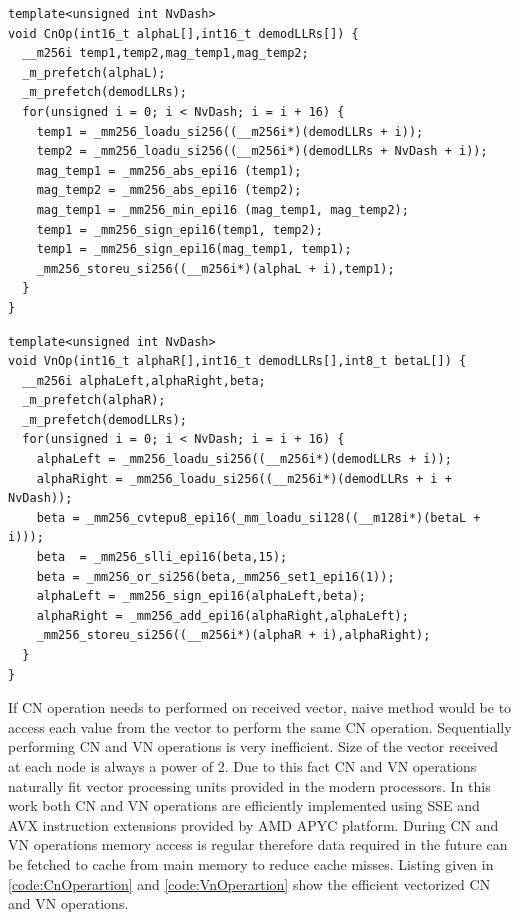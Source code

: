 \begin{code}
\label{code:CnOperartion}
\begin{verbatim}
template<unsigned int NvDash>
void CnOp(int16_t alphaL[],int16_t demodLLRs[]) {
  __m256i temp1,temp2,mag_temp1,mag_temp2;
  _m_prefetch(alphaL);
  _m_prefetch(demodLLRs);
  for(unsigned i = 0; i < NvDash; i = i + 16) {
	temp1 = _mm256_loadu_si256((__m256i*)(demodLLRs + i));
	temp2 = _mm256_loadu_si256((__m256i*)(demodLLRs + NvDash + i));
	mag_temp1 = _mm256_abs_epi16 (temp1);
	mag_temp2 = _mm256_abs_epi16 (temp2);
	mag_temp1 = _mm256_min_epi16 (mag_temp1, mag_temp2);
	temp1 = _mm256_sign_epi16(temp1, temp2);
	temp1 = _mm256_sign_epi16(mag_temp1, temp1);
	_mm256_storeu_si256((__m256i*)(alphaL + i),temp1);
  }
}
\end{verbatim}
\end{code}
\begin{code}
\label{code:VnOperartion}
\begin{verbatim}
template<unsigned int NvDash>
void VnOp(int16_t alphaR[],int16_t demodLLRs[],int8_t betaL[]) {
  __m256i alphaLeft,alphaRight,beta;
  _m_prefetch(alphaR);
  _m_prefetch(demodLLRs);
  for(unsigned i = 0; i < NvDash; i = i + 16) {
    alphaLeft = _mm256_loadu_si256((__m256i*)(demodLLRs + i));
    alphaRight = _mm256_loadu_si256((__m256i*)(demodLLRs + i + NvDash));
    beta = _mm256_cvtepu8_epi16(_mm_loadu_si128((__m128i*)(betaL + i)));
    beta  = _mm256_slli_epi16(beta,15);
    beta = _mm256_or_si256(beta,_mm256_set1_epi16(1));
    alphaLeft = _mm256_sign_epi16(alphaLeft,beta);
    alphaRight = _mm256_add_epi16(alphaRight,alphaLeft);
    _mm256_storeu_si256((__m256i*)(alphaR + i),alphaRight);
  }
}
\end{verbatim}
\end{code}
If CN operation needs to performed on received vector, naive method would be to access each value from the vector to perform the same CN operation. Sequentially performing CN and VN operations is very inefficient. Size of the vector received at each node is always a power of 2. Due to this fact CN and VN operations naturally fit vector processing units provided in the modern processors. In this work both CN and VN operations are efficiently implemented using SSE and AVX instruction extensions provided by AMD APYC platform. During CN and VN operations memory access is regular therefore data required in the future can be fetched to cache from main memory to reduce cache misses. Listing given in \ref{code:CnOperartion} and \ref{code:VnOperartion} show the efficient vectorized CN and VN operations.


